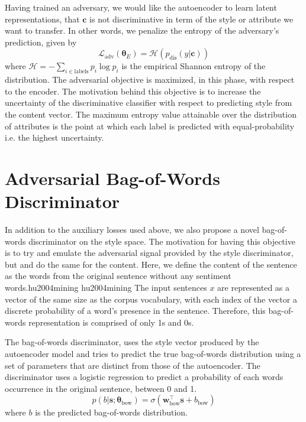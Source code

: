 Having trained an adversary, we would like the autoencoder to learn latent representations, that $\bm c$ is not discriminative in term of the style or attribute we want to transfer. In other words, we penalize the entropy of the adversary's prediction, given by
\begin{equation}
	\mathcal{L}_\text{adv}(\bm\theta_E) = \mathcal{H}(p_\text{dis}(y | \bm c))
\end{equation}
where $\mathcal{H}=-\sum_{i\in\text{labels}} p_i\log p_i$ is the empirical Shannon entropy of the distribution. The adversarial objective is maximized, in this phase, with respect to the encoder. The motivation behind this objective is to increase the uncertainty of the discriminative classifier with respect to predicting style from the content vector. The maximum entropy value attainable over the distribution of attributes is the point at which each label is predicted with equal-probability i.e. the highest uncertainty.


\section{Adversarial Bag-of-Words Discriminator} \label{ssec:adversarial-bow-objective}

In addition to the auxiliary losses used above, we also propose a novel bag-of-words discriminator on the style space. The motivation for having this objective is to try and emulate the adversarial signal provided by the style discriminator, but and do the same for the content. Here, we define the content of the sentence as the words from the original sentence without any sentiment words.hu2004mining
hu2004mining
The input sentences $x$ are represented as a vector of the same size as the corpus vocabulary, with each index of the vector a discrete probability of a word's presence in the sentence. Therefore, this bag-of-words representation is comprised of only 1s and 0s.

The bag-of-words discriminator, uses the style vector produced by the autoencoder model and tries to predict the true bag-of-words distribution using a set of parameters that are distinct from those of the autoencoder. The discriminator uses a logistic regression to predict a probability of each words occurrence in the original sentence, between 0 and 1.
\begin{equation}
	p(b | \bm s; \bm\theta_\text{bow}) = \sigma(\bm w_\text{bow}^\top \bm s + b_\text{bow})
\end{equation}
where $b$ is the predicted bag-of-words distribution.

